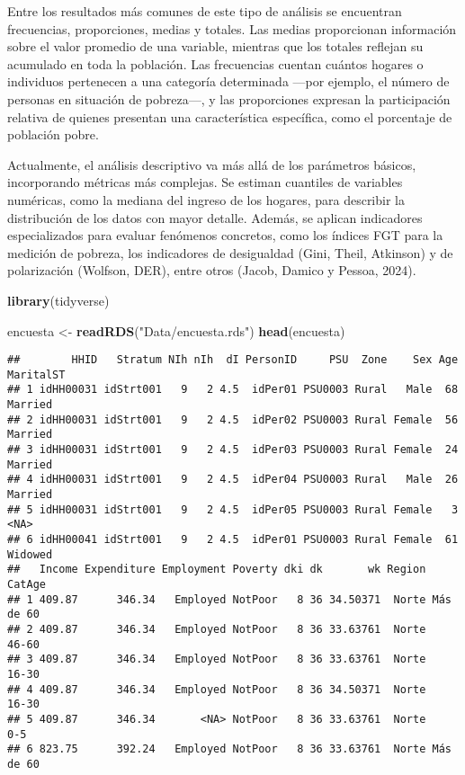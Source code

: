 \documentclass[
  12pt,
]{book}
\newenvironment{Shaded}{\begin{snugshade}}{\end{snugshade}}
\newcommand{\FunctionTok}[1]{\textcolor[rgb]{0.13,0.29,0.53}{\textbf{#1}}}
\newcommand{\NormalTok}[1]{#1}
\newcommand{\OtherTok}[1]{\textcolor[rgb]{0.56,0.35,0.01}{#1}}
\newcommand{\StringTok}[1]{\textcolor[rgb]{0.31,0.60,0.02}{#1}}
\begin{document}
Entre los resultados más comunes de este tipo de análisis se encuentran frecuencias, proporciones, medias y totales. Las medias proporcionan información sobre el valor promedio de una variable, mientras que los totales reflejan su acumulado en toda la población. Las frecuencias cuentan cuántos hogares o individuos pertenecen a una categoría determinada ---por ejemplo, el número de personas en situación de pobreza---, y las proporciones expresan la participación relativa de quienes presentan una característica específica, como el porcentaje de población pobre.

Actualmente, el análisis descriptivo va más allá de los parámetros básicos, incorporando métricas más complejas. Se estiman cuantiles de variables numéricas, como la mediana del ingreso de los hogares, para describir la distribución de los datos con mayor detalle. Además, se aplican indicadores especializados para evaluar fenómenos concretos, como los índices FGT para la medición de pobreza, los indicadores de desigualdad (Gini, Theil, Atkinson) y de polarización (Wolfson, DER), entre otros (Jacob, Damico y Pessoa, 2024).

\begin{Shaded}
\begin{Highlighting}[]
\FunctionTok{library}\NormalTok{(tidyverse)}

\NormalTok{encuesta }\OtherTok{\textless{}{-}} \FunctionTok{readRDS}\NormalTok{(}\StringTok{"Data/encuesta.rds"}\NormalTok{)}
\FunctionTok{head}\NormalTok{(encuesta)}
\end{Highlighting}
\end{Shaded}

\begin{verbatim}
##        HHID   Stratum NIh nIh  dI PersonID     PSU  Zone    Sex Age MaritalST
## 1 idHH00031 idStrt001   9   2 4.5  idPer01 PSU0003 Rural   Male  68   Married
## 2 idHH00031 idStrt001   9   2 4.5  idPer02 PSU0003 Rural Female  56   Married
## 3 idHH00031 idStrt001   9   2 4.5  idPer03 PSU0003 Rural Female  24   Married
## 4 idHH00031 idStrt001   9   2 4.5  idPer04 PSU0003 Rural   Male  26   Married
## 5 idHH00031 idStrt001   9   2 4.5  idPer05 PSU0003 Rural Female   3      <NA>
## 6 idHH00041 idStrt001   9   2 4.5  idPer01 PSU0003 Rural Female  61   Widowed
##   Income Expenditure Employment Poverty dki dk       wk Region    CatAge
## 1 409.87      346.34   Employed NotPoor   8 36 34.50371  Norte Más de 60
## 2 409.87      346.34   Employed NotPoor   8 36 33.63761  Norte     46-60
## 3 409.87      346.34   Employed NotPoor   8 36 33.63761  Norte     16-30
## 4 409.87      346.34   Employed NotPoor   8 36 34.50371  Norte     16-30
## 5 409.87      346.34       <NA> NotPoor   8 36 33.63761  Norte       0-5
## 6 823.75      392.24   Employed NotPoor   8 36 33.63761  Norte Más de 60
\end{verbatim}
\end{document}
